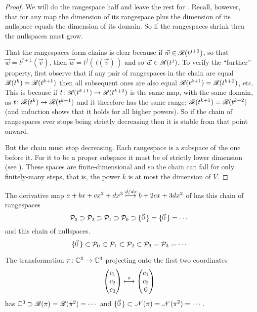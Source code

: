 \begin{proof}
We will do the rangespace half and leave the rest for
.
Recall, however, that for any map the dimension of its rangespace
plus the dimension of its nullspace equals
the dimension of its domain.
So if the rangespaces shrink then the nullspaces must grow.

That the rangespaces form chains is clear
because if $\vec{w}\in\mathscr{R}(t^{j+1})$, so that
$\vec{w}=t^{j+1}(\vec{v})$, 
then $\vec{w}=t^{j}(\,t(\vec{v})\,)$ and so $\vec{w}\in\mathscr{R}(t^{j})$.
To verify the ``further'' property, 
first observe that if any pair of rangespaces in the
chain are equal \( \mathscr{R}(t^{k})=\mathscr{R}(t^{k+1}) \)
then all subsequent ones are also equal
\( \mathscr{R}(t^{k+1})=\mathscr{R}(t^{k+2}) \), etc.
This is because if
\( \mbox{$t\colon \mathscr{R}(t^{k+1})\to \mathscr{R}(t^{k+2})$} \)
is the same map, with the same domain, as
\( \mbox{$t\colon \mathscr{R}(t^{k})\to \mathscr{R}(t^{k+1})$} \) and
it therefore has the same range:
\( \mathscr{R}(t^{k+1})=\mathscr{R}(t^{k+2}) \)
(and induction shows that it holds for all higher powers).
So if the chain of rangespaces ever stops being strictly decreasing then it is 
stable from that point onward.

But the chain must stop decreasing. 
Each rangespace is a subspace of the one before it.
For it to be a proper subspace it must be of strictly lower dimension
(see ).
These spaces are finite-dimensional and so the chain can fall for only
finitely-many steps,
that is, the power $k$ is at most the dimension of $V$.
\end{proof}

\begin{example}
The derivative map $a+bx+cx^2+dx^3\stackrel{d/dx}{\longmapsto} b+2cx+3dx^2$
of  has this chain of rangespaces
\begin{equation*}
  \mathcal{P}_3\supset\mathcal{P}_2\supset\mathcal{P}_1
    \supset\mathcal{P}_0\supset\mbox{$\{\vec{0}\,\}$}=\mbox{$\{\vec{0}\,\}$}=\cdots
\end{equation*}
and this chain of nullspaces.
\begin{equation*}
  \mbox{$\{\vec{0}\,\}$}\subset\mathcal{P}_0\subset\mathcal{P}_1\subset\mathcal{P}_2
    \subset\mathcal{P}_3=\mathcal{P}_3=\cdots
\end{equation*}
\end{example}

\begin{example}
The transformation \( \mbox{$\pi\colon \mathbb{C}^3\to \mathbb{C}^3$} \) projecting onto the
first two coordinates
\begin{equation*}
   \begin{pmatrix} c_1 \\ c_2 \\ c_3 \end{pmatrix}
     \stackrel{\pi}{\longmapsto}
   \begin{pmatrix} c_1 \\ c_2 \\ 0 \end{pmatrix}
\end{equation*}
has \( \mathbb{C}^3\supset\mathscr{R}(\pi)=\mathscr{R}(\pi^2)=\cdots \)
and \( \mbox{$\{\vec{0}\,\}$}\subset\mathscr{N}(\pi)=\mathscr{N}(\pi^2)=\cdots\, \).
\end{example}

